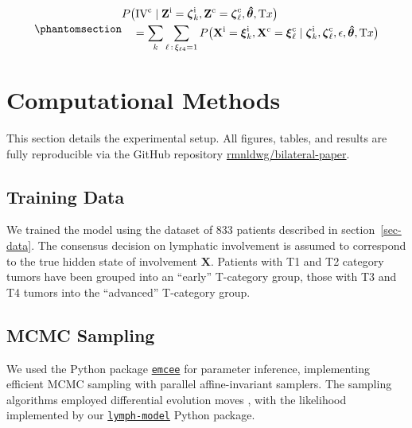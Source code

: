 \documentclass[
  sn-mathphys-num,
]{sn-jnl}
\begin{document}
\begin{equation}\phantomsection\label{eq-marg-over-posterior}{
\begin{multlined}
P \big( \text{IV}^\text{c} \mid \mathbf{Z}^\text{i}=\boldsymbol{\zeta}^\text{i}_k, \mathbf{Z}^\text{c}=\boldsymbol{\zeta}^\text{c}_\ell, \boldsymbol{\hat{\theta}}, \text{T}x \big) \\
= \sum_k \sum_{\ell \, : \, \xi_{\ell 4}=1} P \big( \mathbf{X}^\text{i} = \boldsymbol{\xi}^\text{i}_k, \mathbf{X}^\text{c} = \boldsymbol{\xi}^\text{c}_\ell \mid \boldsymbol{\zeta}^\text{i}_k, \boldsymbol{\zeta}^\text{c}_\ell, \epsilon, \boldsymbol{\hat{\theta}}, \text{T}x \big)
\end{multlined}
}\end{equation}

\section{Computational Methods}\label{sec-methods}

This section details the experimental setup. All figures, tables, and
results are fully reproducible via the GitHub repository
\href{https://github.com/rmnldwg/bilateral-paper}{rmnldwg/bilateral-paper}.

\subsection{Training Data}\label{sec-training-data}

We trained the model using the dataset of 833 patients described in
section~\ref{sec-data}. The consensus decision on lymphatic involvement
is assumed to correspond to the true hidden state of involvement
\(\mathbf{X}\). Patients with T1 and T2 category tumors have been
grouped into an ``early'' T-category group, those with T3 and T4 tumors
into the ``advanced'' T-category group.

\subsection{MCMC Sampling}\label{sec-sampling}

We used the Python package
\href{https://emcee.readthedocs.io/en/stable/}{\texttt{emcee}}
\citep{foreman-mackey_emcee_2013} for parameter inference, implementing
efficient MCMC sampling with parallel affine-invariant samplers. The
sampling algorithms employed differential evolution moves
\citep{terbraak_differential_2008, nelson_run_2013}, with the likelihood
implemented by our
\href{https://lymph-model.readthedocs.io/en/stable/}{\texttt{lymph-model}}
Python package.
\end{document}
